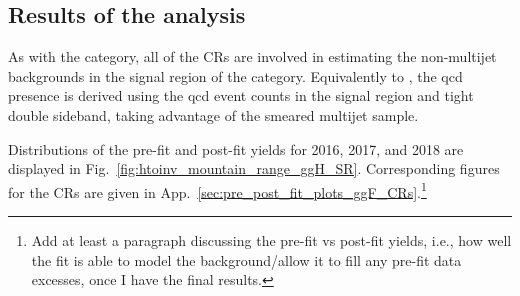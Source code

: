 \clearpage




\subsection{Results of the \texorpdfstring{\ggH}{ggH} analysis}
\label{subsec:htoinv_analysis_ggF}

As with the \VH category, all of the \glspl{CR} are involved in estimating the non-multijet backgrounds in the signal region of the \ggH category. Equivalently to \ttH, the \acrshort{qcd} presence is derived using the \acrshort{qcd} event counts in the signal region and tight double sideband, taking advantage of the smeared multijet sample.

Distributions of the pre-fit and post-fit yields for 2016, 2017, and 2018 are displayed in Fig.~\ref{fig:htoinv_mountain_range_ggH_SR}. Corresponding figures for the \glspl{CR} are given in App.~\ref{sec:pre_post_fit_plots_ggF_CRs}.\footnote{Add at least a paragraph discussing the pre-fit vs post-fit yields, i.e., how well the fit is able to model the background/allow it to fill any pre-fit data excesses, once I have the final results.}

